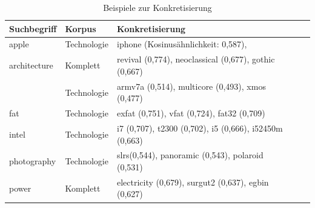 \documentclass[12pt,a4paper]{report}
\begin{document}
\begin{table}[h]
\caption{Beispiele zur Konkretisierung}
\begin{center}
\begin{tabular}{|l||l|l|l|l|}
\hline
Suchbegriff & Korpus & Konkretisierung   \\

\hline
 apple & Technologie & iphone (Kosinusähnlichkeit: 0,587),\\
 \hline
 architecture	   & Komplett & revival (0,774), neoclassical (0,677), gothic (0,667) \\
 & Technologie& armv7a (0,514), multicore (0,493), xmos (0,477) \\
\hline
 fat	& Technologie	& exfat (0,751), vfat (0,724), fat32 (0,709)	\\
 	\hline
 intel	 & Technologie& i7 (0,707), t2300 (0,702), i5 (0,666), i52450m (0,663) \\
 \hline
 photography	& Technologie& slrs(0,544), panoramic (0,543), polaroid (0,531)\\
 	\hline
 power	&	Komplett &	electricity (0,679), surgut2 (0,637), egbin (0,627) \\
 	\hline
 
\end{tabular}
\end{center}
\end{table}
		
\end{document}
